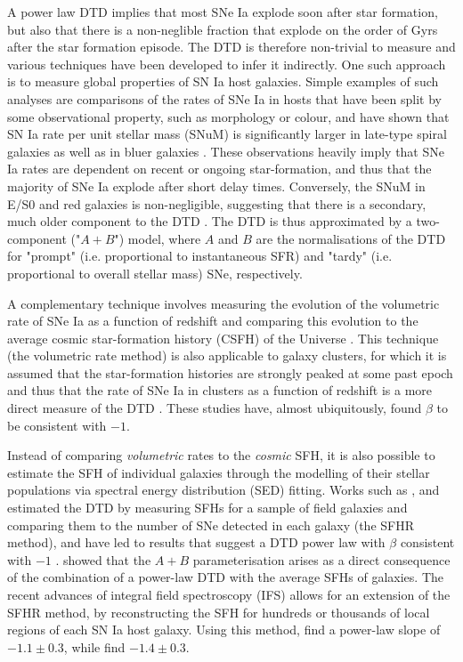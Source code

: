 \documentclass[fleqn,usenatbib]{mnras}
\begin{document}
A power law DTD implies that most SNe Ia explode soon after star formation, but also that there is a non-neglible fraction that explode on the order of Gyrs after the star formation episode. The DTD is therefore non-trivial to measure and various techniques have been developed to infer it indirectly. One such approach is to measure global properties of SN Ia host galaxies. Simple examples of such analyses are comparisons of the rates of SNe Ia in hosts that have been split by some observational property, such as morphology or colour, and have shown that SN Ia rate per unit stellar mass (SNuM) is significantly larger in late-type spiral galaxies as well as in bluer galaxies \citep[e.g.][]{Mannucci2005}. These observations heavily imply that SNe Ia rates are dependent on recent or ongoing star-formation, and thus that the majority of SNe Ia explode after short delay times. Conversely, the SNuM in E/S0 and red galaxies is non-negligible, suggesting that there is a secondary, much older component to the DTD \citep{Sullivan2006,Li2011a,Smith2012}. The DTD is thus approximated by a two-component ("$A + B$") model, where $A$ and $B$ are the normalisations of the DTD for "prompt" (i.e. proportional to instantaneous SFR) and "tardy" (i.e. proportional to overall stellar mass) SNe, respectively.

A complementary technique involves measuring the evolution of the volumetric rate of SNe Ia as a function of redshift and comparing this evolution to the average cosmic star-formation history (CSFH) of the Universe \citep{Gal-Yam2004,Strolger2004,Dahlen2004,Dahlen2008, Graur2013, Frohmaier2019}. This technique (the volumetric rate method) is also applicable to galaxy clusters, for which it is assumed that the star-formation histories are strongly peaked at some past epoch and thus that the rate of SNe Ia in clusters as a function of redshift is a more direct measure of the DTD \citep{Maoz2004,Graur2014,Maoz2014}. These studies have, almost ubiquitously, found $\beta$ to be consistent with $-1$.

Instead of comparing \textit{volumetric} rates to the \textit{cosmic} SFH, it is also possible to estimate the SFH of individual galaxies through the modelling of their stellar populations via spectral energy distribution (SED) fitting. Works such as \citet{Maoz2011}, \citet{Maoz2012} and \citet{Graur2013} estimated the DTD by measuring SFHs for a sample of field galaxies and comparing them to the number of SNe detected in each galaxy (the SFHR method), and have led to results that suggest a DTD power law with $\beta$ consistent with $-1$ \citep[e.g.][]{Maoz2011,Graur2013}. \citet{Childress2014} showed that the $A+B$ parameterisation arises as a direct consequence of the combination of a power-law DTD with the average SFHs of galaxies. The recent advances of integral field spectroscopy (IFS) allows for an extension of the SFHR method, by reconstructing the SFH for hundreds or thousands of local regions of each SN Ia host galaxy. Using this method, \citet{Castrillo2020} find a power-law slope of $-1.1\pm0.3$, while \citet{Chen2021} find $-1.4\pm0.3$.
\end{document}
